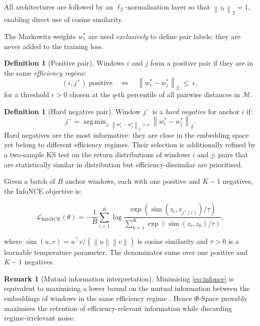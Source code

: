 \documentclass[preprint,12pt]{elsarticle}
\theoremstyle{plain}
\theoremstyle{definition}
\newtheorem{definition}[theorem]{Definition}
\newtheorem{remark}[theorem]{Remark}
\newcommand{\calM}{\mathcal{M}}
\newcommand{\norm}[1]{\left\|#1\right\|}
\DeclareMathOperator*{\argmin}{arg\,min}
\begin{document}
All architectures are followed by an $\ell_2$-normalisation layer so that
$\norm{z_t}_2 = 1$, enabling direct use of cosine similarity.

The Markowitz weights $w_t^*$ are used \emph{exclusively} to define pair labels;
they are never added to the training loss.

\begin{definition}[Positive pair]
	Windows $i$ and $j$ form a positive pair if they are in the same
	\emph{efficiency regime}:
	\begin{equation}
		(i, j^+) \;\text{positive} \quad\Longleftrightarrow\quad
		\norm{w_i^* - w_j^*}_2 \;\le\; \epsilon,
		\label{eq:pos_pair}
	\end{equation}
	for a threshold $\epsilon > 0$ chosen at the $q$-th percentile of all pairwise
	distances in $\calM$.
\end{definition}

\begin{definition}[Hard negative pair]
	Window $j^-$ is a \emph{hard negative} for anchor $i$ if:
	\[
	j^- = \argmin_{j:\,\norm{w_i^*-w_j^*}_2 > \epsilon}
	\norm{w_i^* - w_j^*}_2.
	\]
	Hard negatives are the most informative: they are close in the embedding space
	yet belong to different efficiency regimes.  Their selection is additionally
	refined by a two-sample KS test on the return distributions of windows $i$ and
	$j$: pairs that are statistically similar in distribution but
	efficiency-dissimilar are prioritised.
\end{definition}


Given a batch of $B$ anchor windows, each with one positive and $K-1$ negatives,
the InfoNCE objective is:

\begin{equation}
	\mathcal{L}_{\mathrm{InfoNCE}}(\theta)
	=
	-\frac{1}{B}
	\sum_{i=1}^{B}
	\log
	\frac{
		\exp\!\left(
		\operatorname{sim}(z_i,z_{j^{+}(i)})/\tau
		\right)
	}{
		\sum_{k=1}^{K}
		\exp\!\left(
		\operatorname{sim}(z_i,z_k)/\tau
		\right)
	},
	\label{eq:infonce}
\end{equation}

where $\operatorname{sim}(u, v) = u^\top v / (\norm{u}\norm{v})$ is cosine
similarity and $\tau > 0$ is a learnable temperature parameter.  The denominator
sums over one positive and $K-1$ negatives.

\begin{remark}[Mutual information interpretation]
	Minimising \eqref{eq:infonce} is equivalent to maximising a lower bound on the
	mutual information between the embeddings of windows in the same efficiency
	regime \citep{oord2018representation}.  Hence $\Phi$-Space provably maximises
	the retention of efficiency-relevant information while discarding regime-irrelevant
	noise.
\end{remark}
\end{document}
